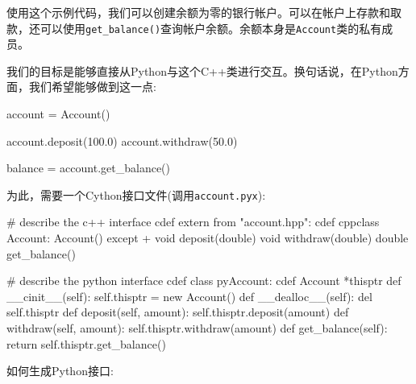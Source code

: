 使用这个示例代码，我们可以创建余额为零的银行帐户。可以在帐户上存款和取款，还可以使用\texttt{get\_balance()}查询帐户余额。余额本身是\texttt{Account}类的私有成员。

我们的目标是能够直接从Python与这个C++类进行交互。换句话说，在Python方面，我们希望能够做到这一点:

\begin{codebox}[python]
account = Account()

account.deposit(100.0)
account.withdraw(50.0)

balance = account.get_balance()
\end{codebox}

为此，需要一个Cython接口文件(调用\texttt{account.pyx}):

\begin{codebox}[python]
# describe the c++ interface
cdef extern from "account.hpp":
  cdef cppclass Account:
    Account() except +
    void deposit(double)
    void withdraw(double)
    double get_balance()

# describe the python interface
cdef class pyAccount:
  cdef Account *thisptr
  def __cinit__(self):
    self.thisptr = new Account()
  def __dealloc__(self):
    del self.thisptr
  def deposit(self, amount):
    self.thisptr.deposit(amount)
  def withdraw(self, amount):
    self.thisptr.withdraw(amount)
  def get_balance(self):
    return self.thisptr.get_balance()
\end{codebox}


如何生成Python接口:

